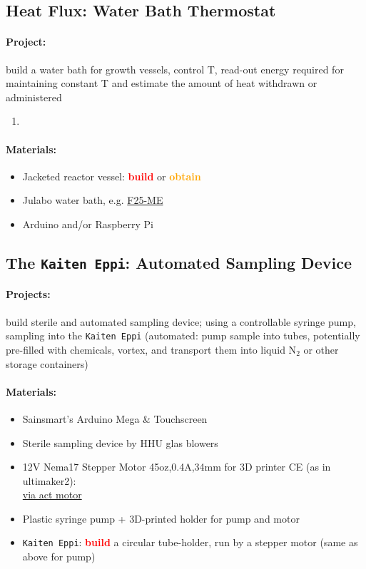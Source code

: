 \documentclass[12pt,a4paper]{scrartcl}
\newcommand{\obtain}[0]{\textcolor{orange}{\textbf{obtain}}}
\newcommand{\build}[0]{\textcolor{red}{\textbf{build}}}
\begin{document}
\newpage
\subsection{Heat Flux: Water Bath Thermostat}
\label{heat}

\paragraph{Project:} build a water bath for growth vessels, control
T, read-out energy required for maintaining constant T and estimate
the amount of heat withdrawn or administered

\begin{enumerate}
\item
\end{enumerate}

\paragraph{Materials:}
\begin{itemize}
\item Jacketed reactor vessel: \build{} or \obtain{}
\item Julabo water bath,
e.g. \href{http://www.laborhandel24.de/9162625-de?utm_source=google_shopping&gclid=Cj0KEQiA496zBRDoi5OY3p2xmaUBEiQArLNnK6uWkryhjvkNdmRLgcg2W_HIO9W1aKaKCO9gmvlkt_MaAmhe8P8HAQ}{F25-ME}
\item Arduino and/or Raspberry Pi
\end{itemize}

\newpage
\subsection{The \texttt{Kaiten Eppi}: Automated Sampling Device} 
\label{sampling}
\paragraph{Projects:} build sterile and automated sampling device; using
a controllable syringe pump, sampling into the \texttt{Kaiten Eppi}
(automated: pump sample into tubes, potentially pre-filled with
chemicals, vortex, and transport them into liquid N$_2$ or other
storage containers)

\paragraph{Materials:}
\begin{itemize}
\item Sainsmart's Arduino Mega \& Touchscreen
\item Sterile sampling device by HHU glas blowers
\item 12V Nema17 Stepper Motor 45oz,0.4A,34mm for 3D printer CE (as in ultimaker2):\\
  \href{http://www.ebay.com/itm/251604407772?_trksid=p2055119.m1438.l2649&ssPageName=STRK\%3AMEBIDX\%3AIT}{via act motor}
\item Plastic syringe pump + 3D-printed holder for pump and motor
\item \texttt{Kaiten Eppi}: \build{} a circular tube-holder, run by a
  stepper motor (same as above for pump)
\end{itemize}
\end{document}
